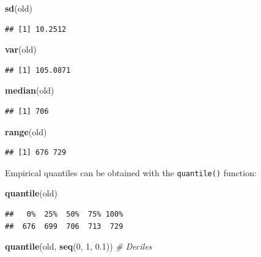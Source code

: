 \documentclass[
]{article}
\newenvironment{Shaded}{\begin{snugshade}}{\end{snugshade}}
\newcommand{\CommentTok}[1]{\textcolor[rgb]{0.56,0.35,0.01}{\textit{#1}}}
\newcommand{\DecValTok}[1]{\textcolor[rgb]{0.00,0.00,0.81}{#1}}
\newcommand{\FloatTok}[1]{\textcolor[rgb]{0.00,0.00,0.81}{#1}}
\newcommand{\FunctionTok}[1]{\textcolor[rgb]{0.13,0.29,0.53}{\textbf{#1}}}
\newcommand{\NormalTok}[1]{#1}
\begin{document}
\begin{Shaded}
\begin{Highlighting}[]
\FunctionTok{sd}\NormalTok{(old)}
\end{Highlighting}
\end{Shaded}

\begin{verbatim}
## [1] 10.2512
\end{verbatim}

\begin{Shaded}
\begin{Highlighting}[]
\FunctionTok{var}\NormalTok{(old)}
\end{Highlighting}
\end{Shaded}

\begin{verbatim}
## [1] 105.0871
\end{verbatim}

\begin{Shaded}
\begin{Highlighting}[]
\FunctionTok{median}\NormalTok{(old)}
\end{Highlighting}
\end{Shaded}

\begin{verbatim}
## [1] 706
\end{verbatim}

\begin{Shaded}
\begin{Highlighting}[]
\FunctionTok{range}\NormalTok{(old)}
\end{Highlighting}
\end{Shaded}

\begin{verbatim}
## [1] 676 729
\end{verbatim}

Empirical quantiles can be obtained with the \texttt{quantile()}
function:

\begin{Shaded}
\begin{Highlighting}[]
\FunctionTok{quantile}\NormalTok{(old)}
\end{Highlighting}
\end{Shaded}

\begin{verbatim}
##   0%  25%  50%  75% 100% 
##  676  699  706  713  729
\end{verbatim}

\begin{Shaded}
\begin{Highlighting}[]
\FunctionTok{quantile}\NormalTok{(old, }\FunctionTok{seq}\NormalTok{(}\DecValTok{0}\NormalTok{, }\DecValTok{1}\NormalTok{, }\FloatTok{0.1}\NormalTok{))  }\CommentTok{\# Deciles}
\end{Highlighting}
\end{Shaded}
\end{document}
